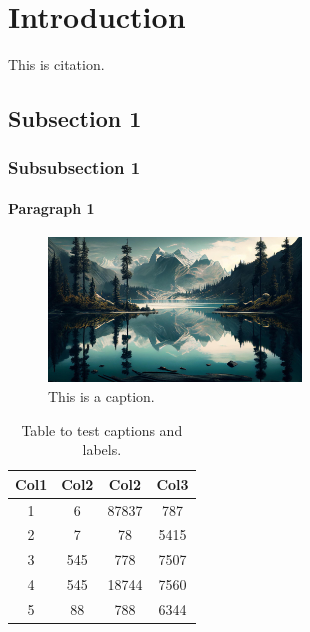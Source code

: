 \section{Introduction}
\lipsum[2-3]
This is citation.\cite{neese2018}

\subsection{Subsection 1}

\subsubsection{Subsubsection 1}

\paragraph{Paragraph 1}
\lipsum[4]

\begin{figure}[!htbp]
    \centering
    \includegraphics[width=0.6\textwidth]{src/images/example.jpg}
    \caption{This is a caption.}
\end{figure}


\begin{table}[h!]
    \centering
    \begin{tabular}{c c c c} 
     \hline
     Col1 & Col2 & Col2 & Col3 \\ 
     \hline
     1 & 6 & 87837 & 787 \\ 
     2 & 7 & 78 & 5415 \\
     3 & 545 & 778 & 7507 \\
     4 & 545 & 18744 & 7560 \\
     5 & 88 & 788 & 6344 \\
     \hline
    \end{tabular}
    \caption{Table to test captions and labels.}
    \label{table:1}
\end{table}